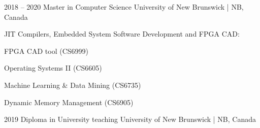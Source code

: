 

\entrys
{2018 -- 2020}
{Master in Computer Science}
{University of New Brunswick | NB, Canada}
{JIT Compilers, Embedded System Software Development and FPGA CAD:
\begin{tightemize}
\item FPGA CAD tool (CS6999)

\item Operating Systems II (CS6605)

\item Machine Learning \& Data Mining (CS6735)

\item Dynamic Memory Management (CS6905)
\end{tightemize}
}

\entrys
{2019}
{Diploma in University teaching}
{University of New Brunswick | NB, Canada}
{}


